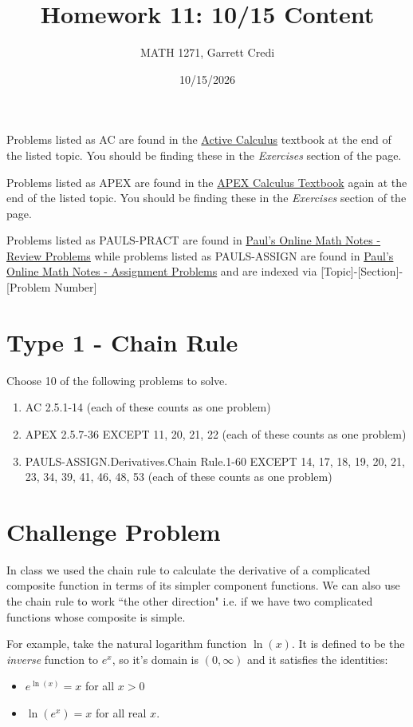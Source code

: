 \documentclass[12pt]{article}
\title{Homework 11: 10/15 Content}
\author{MATH 1271, Garrett Credi}
\date{10/15/2026}
\begin{document}
\maketitle

Problems listed as AC are found in the \href{https://activecalculus.org/single2e/frontmatter.html}{Active Calculus} 
textbook at the end of the listed topic. You should be finding these in the \textit{Exercises} section of the page.

Problems listed as APEX are found in the \href{https://opentext.uleth.ca/apex-calculus/apex-calculus.html}{APEX Calculus Textbook}
again at the end of the listed topic. You should be finding these in the \textit{Exercises} section of the page.

Problems listed as PAULS-PRACT are found in \href{https://tutorial.math.lamar.edu/Problems/CalcI/CalcI.aspx}{Paul's Online Math Notes - Review Problems}
while problems listed as PAULS-ASSIGN are found in \href{https://tutorial.math.lamar.edu/ProblemsNS/CalcI/CalcI.aspx}{Paul's Online Math Notes - Assignment Problems}
and are indexed via [Topic]-[Section]-[Problem Number]

\section{Type 1 - Chain Rule}
Choose 10 of the following problems to solve.

\begin{enumerate}
  \item AC 2.5.1-14 (each of these counts as one problem)
  \item APEX 2.5.7-36 EXCEPT 11, 20, 21, 22  (each of these counts as one problem)
  \item PAULS-ASSIGN.Derivatives.Chain Rule.1-60 EXCEPT 14, 17, 18, 19, 20, 21, 23, 34, 39, 41, 46, 48, 53 (each of these counts as one problem)
\end{enumerate}

\section{Challenge Problem}
In class we used the chain rule to 
calculate the derivative of a complicated composite function
in terms of its simpler component functions.
We can also use the chain rule to work ``the other direction"
i.e. if we have two complicated functions whose composite
is simple.

For example, take the natural logarithm function $\ln(x)$.
It is defined to be the \textit{inverse} function to $e^x$,
so it's domain is $(0, \infty)$ and it satisfies the identities:
\begin{itemize}
  \item $e^{\ln(x)} = x$ for all $x > 0$
  \item $\ln(e^x) = x$ for all real $x$.
\end{itemize}
\end{document}
